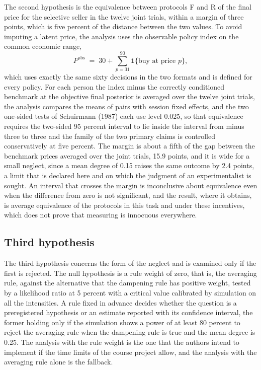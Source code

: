 \documentclass[11pt,a4paper]{article}
\begin{document}
The second hypothesis is the equivalence between protocols F and R of the final price for the selective seller in the twelve joint trials, within a margin of three points, which is five percent of the distance between the two values. To avoid imputing a latent price, the analysis uses the observable policy index on the common economic range,
\[
P^{\mathrm{obs}} \;=\; 30+\sum_{p=31}^{90}\mathbf{1}\{\text{buy at price } p\},
\]
which uses exactly the same sixty decisions in the two formats and is defined for every policy. For each person the index minus the correctly conditioned benchmark at the objective final posterior is averaged over the twelve joint trials, the analysis compares the means of pairs with session fixed effects, and the two one-sided tests of Schuirmann (1987) each use level 0.025, so that equivalence requires the two-sided 95 percent interval to lie inside the interval from minus three to three and the family of the two primary claims is controlled conservatively at five percent. The margin is about a fifth of the gap between the benchmark prices averaged over the joint trials, 15.9 points, and it is wide for a small neglect, since a mean degree of 0.15 raises the same outcome by 2.4 points, a limit that is declared here and on which the judgment of an experimentalist is sought. An interval that crosses the margin is inconclusive about equivalence even when the difference from zero is not significant, and the result, where it obtains, is average equivalence of the protocols in this task and under these incentives, which does not prove that measuring is innocuous everywhere.

\subsection{Third hypothesis}

The third hypothesis concerns the form of the neglect and is examined only if the first is rejected. The null hypothesis is a rule weight of zero, that is, the averaging rule, against the alternative that the dampening rule has positive weight, tested by a likelihood ratio at 5 percent with a critical value calibrated by simulation on all the intensities. A rule fixed in advance decides whether the question is a preregistered hypothesis or an estimate reported with its confidence interval, the former holding only if the simulation shows a power of at least 80 percent to reject the averaging rule when the dampening rule is true and the mean degree is 0.25. The analysis with the rule weight is the one that the authors intend to implement if the time limits of the course project allow, and the analysis with the averaging rule alone is the fallback.
\end{document}
